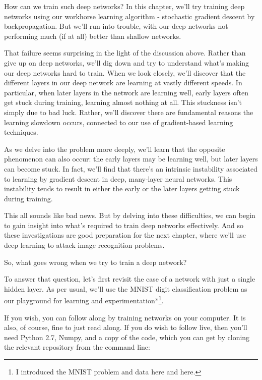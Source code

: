How can we train such deep networks? In this chapter, we'll try training deep networks using our workhorse learning algorithm - stochastic gradient descent by backpropagation. But we'll run into trouble, with our deep networks not performing much (if at all) better than shallow networks.


That failure seems surprising in the light of the discussion above. Rather than give up on deep networks, we'll dig down and try to understand what's making our deep networks hard to train. When we look closely, we'll discover that the different layers in our deep network are learning at vastly different speeds. In particular, when later layers in the network are learning well, early layers often get stuck during training, learning almost nothing at all. This stuckness isn't simply due to bad luck. Rather, we'll discover there are fundamental reasons the learning slowdown occurs, connected to our use of gradient-based learning techniques.


As we delve into the problem more deeply, we'll learn that the opposite phenomenon can also occur: the early layers may be learning well, but later layers can become stuck. In fact, we'll find that there's an intrinsic instability associated to learning by gradient descent in deep, many-layer neural networks. This instability tends to result in either the early or the later layers getting stuck during training.


This all sounds like bad news. But by delving into these difficulties, we can begin to gain insight into what's required to train deep networks effectively. And so these investigations are good preparation for the next chapter, where we'll use deep learning to attack image recognition problems.





So, what goes wrong when we try to train a deep network?


To answer that question, let's first revisit the case of a network with just a single hidden layer. As per usual, we'll use the MNIST digit classification problem as our playground for learning and experimentation*\footnote{I introduced the MNIST problem and data here and here.}.


If you wish, you can follow along by training networks on your computer. It is also, of course, fine to just read along. If you do wish to follow live, then you'll need Python 2.7, Numpy, and a copy of the code, which you can get by cloning the relevant repository from the command line:



